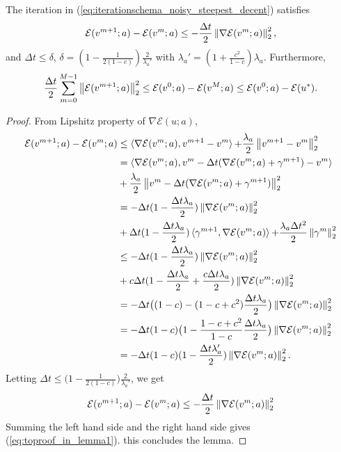 \begin{lemma}
	\label{lemma1}
	The iteration in (\ref{eq:iterationschema_noisy_steepest_decent}) satisfies
	\begin{equation}
		\mathcal{E}(v^{m+1};a) - \mathcal{E}(v^m;a) \leq - \frac{\Delta t}{2} \left\lVert\nabla \mathcal{E}(v^m;a)\right\rVert_{2}^{2},
	\end{equation}
	and $\Delta t \leq \delta$, $\delta = (1-\frac{1}{2(1-c)}) \frac{2}{\lambda_{a}'}$ with $\lambda_{a}' = (1+ \frac{c^2}{1-c}) \lambda_{a}$. Furthermore, 
	\begin{equation}
		\label{eq:toproof_in_lemma1}
		\frac{\Delta t}{2} \sum_{m = 0}^{M-1} \left\lVert\mathcal{E}(v^{m+1};a)\right\rVert_{2}^{2} \leq \mathcal{E}(v^0;a) - \mathcal{E}(v^M;a) \leq \mathcal{E}(v^0;a) - \mathcal{E}(u^*).
	\end{equation}
	\begin{proof}
		From Lipshitz property of $\nabla \mathcal{E}(u;a)$,
		\begin{align*}
			\mathcal{E}(v^{m+1};a) - \mathcal{E}(v^m; a) & \leq \mathop{\langle \nabla \mathcal{E}(v^m;a), v^{m+1} - v^m \rangle} + \frac{\lambda_{a}}{2} \left\lVert v^{m+1} - v^m\right\rVert_{2}^{2}\\
			&= \mathop{\langle \nabla \mathcal{E}(v^m;a),  v^m - \Delta t(\nabla \mathcal{E}(v^m;a) + \gamma^{m+1}) - v^m \rangle} \\
			&+ \frac{\lambda_{a}}{2} \left\lVert v^m - \Delta t (\nabla \mathcal{E}(v^m;a) + \gamma^{m+1})\right\rVert_{2}^{2} \\
			&= - \Delta t(1-\frac{\Delta t \lambda_{a}}{2}) \left\lVert\nabla \mathcal{E}(v^m;a)\right\rVert_{2}^{2}\\
			&+ \Delta t (1- \frac{\Delta t \lambda_{a}}{2}) \mathop{\langle \gamma^{m+1}, \nabla \mathcal{E}(v^m;a) \rangle} + \frac{\lambda_{a} \Delta t^2}{2} \left\lVert\gamma^m\right\rVert_{2}^{2} \\ 
			&\leq -\Delta t (1-\frac{\Delta t \lambda_{a}}{2}) \left\lVert\nabla \mathcal{E}(v^m;a)\right\rVert_{2}^{2} \\
			&+ c\Delta t (1- \frac{\Delta t \lambda_{a}}{2} + \frac{c\Delta t \lambda_{a}}{2}) \left\lVert\nabla \mathcal{E}(v^m;a)\right\rVert_{2}^{2}\\
			&= - \Delta t \big( (1-c) - (1-c+c^2) \frac{\Delta t \lambda_{a}}{2} \big) \left\lVert\nabla \mathcal{E}(v^m;a)\right\rVert_{2}^{2}\\
			&=-\Delta t (1-c) \big( 1- \frac{1-c+c^2}{1-c} \frac{\Delta t \lambda_{a}}{2} \big) \left\lVert\nabla \mathcal{E}(v^m;a)\right\rVert_{2}^{2} \\
			&=-\Delta t (1-c) (1- \frac{\Delta t \lambda_{a}'}{2}) \left\lVert\nabla \mathcal{E}(v^m;a)\right\rVert_{2}^{2}.
		\end{align*}
		Letting $\Delta t \leq \big(1-\frac{1}{2(1-c)}\big) \frac{2}{\lambda_{a}'}$, we get 
		\begin{equation}
			\mathcal{E}(v^{m+1};a) - \mathcal{E}(v^m;a) \leq -\frac{\Delta t}{2} \left\lVert\nabla \mathcal{E}(v^m;a)\right\rVert_{2}^{2}
		\end{equation}
		Summing the left hand side and the right hand side gives (\ref{eq:toproof_in_lemma1}). this concludes the lemma.
	\end{proof}
\end{lemma}
